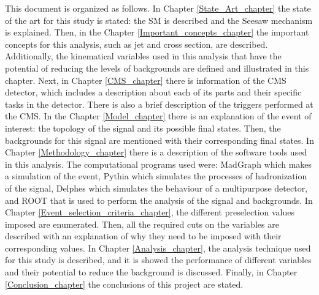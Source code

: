 This document is organized as follows. In Chapter \ref{State_Art_chapter} the state of the art for this study is stated: the SM is described and the Seesaw mechanism is explained. Then, in the Chapter \ref{Important_concepts_chapter} the important concepts for this analysis, such as jet and cross section, are described. Additionally, the kinematical variables used in this analysis that have the potential of reducing the levels of backgrounds are defined and illustrated in this chapter. Next, in Chapter \ref{CMS_chapter} there is information of the CMS detector, which includes a description about each of its parts and their specific tasks in the detector. There is also a brief description of the triggers performed at the CMS. In the Chapter \ref{Model_chapter} there is an explanation of the event of interest: the topology of the signal and its possible final states. Then, the backgrounds for this signal are mentioned with their corresponding final states. In Chapter \ref{Methodology_chapter} there is a description of the software tools used in this analysis. The computational programs used were: MadGraph which makes a simulation of the event, Pythia which simulates the processes of hadronization of the signal, Delphes which simulates the behaviour of a multipurpose detector, and ROOT that is used to perform the analysis of the signal and backgrounds. In Chapter \ref{Event_selection_criteria_chapter}, the different preselection values imposed are enumerated. Then, all the required cuts on the variables are described with an explanation of why they need to be imposed with their corresponding values. In Chapter \ref{Analysis_chapter}, the analysis technique used for this study is described, and it is showed the performance of different variables and their potential to reduce the background is discussed. Finally, in Chapter \ref{Conclusion_chapter} the conclusions of this project are stated. 

